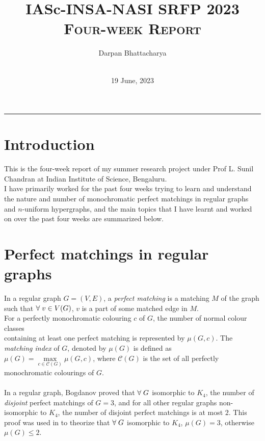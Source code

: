 \documentclass[11pt]{article}
\title{\textbf{IASc-INSA-NASI SRFP 2023}\\
       \textsc{Four-week Report}}
\author{\vspace{0.1cm}Darpan Bhattacharya \\
\fontfamily{cmss}\selectfont{\footnotesize{Application ID: ENGS302}} \\
\fontfamily{cmss}\selectfont{\footnotesize{Guide: Prof L. Sunil Chandran, IISc Bengaluru}}}
\date{19 June, 2023}
\begin{document}
\maketitle
\hrule

\section*{Introduction}
This is the four-week report of my summer research project under Prof L. Sunil Chandran at Indian Institute of Science, Bengaluru. \\
I have primarily worked for the past four weeks trying to learn and understand the nature and number of monochromatic perfect matchings in regular graphs and $n$-uniform hypergraphs, and the main topics that I have learnt and worked on over the past four weeks are summarized below.

\section*{Perfect matchings in regular graphs}
In a regular graph $G=(V,E)$, a \textit{perfect matching} is a matching $M$ of the graph such that $\forall \hspace{0.1cm} v \in V(G)$, $v$ is a part of some matched edge in $M$. \\
For a perfectly monochromatic colouring $c$ of $G$, the number of normal colour classes \\containing at least one perfect matching is represented by $\mu(G,c)$.
The \textit{matching index} of $G$, denoted by $\mu(G)$ is defined as \mbox{$\mu(G) = \max\limits_{c \in \mathcal{C}(G)} \mu(G,c)$}, where $\mathcal{C}(G)$ is the set of all perfectly monochromatic colourings of $G$. \\ \\
In a regular graph, Bogdanov\cite{bogdanov} proved that $\forall \hspace{0.1cm} G$ isomorphic to $K_4$, the number of \\\textit{disjoint} perfect matchings of $G=3$, and for all other regular graphs non-isomorphic to $K_4$, the number of disjoint perfect matchings is at most $2$. This proof was used in \cite{chandran2022perfect} to theorize that $\forall \hspace{0.1cm} G$ isomorphic to $K_4$, $\mu(G)=3$, otherwise $\mu(G) \le 2$.
\end{document}

